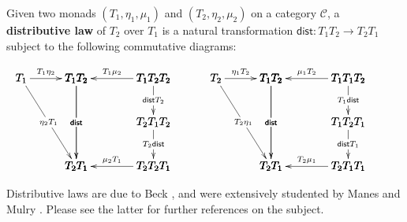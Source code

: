 \documentclass{article}
\let\mto\to
\let\to\relax
\newcommand{\to}{\rightarrow}
\newcommand{\cat}[1]{\mathcal{#1}}
\begin{document}
Given two monads $(T_1,\eta_1,\mu_1)$ and $(T_2,\eta_2,\mu_2)$ on a
category $\cat{C}$, a \textbf{distributive law} of $T_2$ over $T_1$ is
a natural transformation $\mathsf{dist} : T_1T_2 \mto T_2T_1$
subject to the following commutative diagrams:
\begin{center}  
  \begin{math}
    \begin{array}{lll}
      \bfig
      \qtriangle|amm|<500,800>[
        T_1`
        T_1T_2`
        T_2T_1;
        T_1\eta_2`
        \eta_2T_1`
        \mathsf{dist}]
      \square(500,0)|amma|/<-`->``<-/<700,800>[
        T_1T_2`
        T_1T_2T_2`
        T_2T_1`
        T_2T_2T_1;
        T_1\mu_2`
        \mathsf{dist}``
        \mu_2T_1]
      \morphism(1200,800)|m|<0,-400>[
        T_1T_2T_2`
        T_2T_1T_2;
        \mathsf{dist}T_2]
      \morphism(1200,400)|m|<0,-400>[
        T_2T_1T_2`
        T_2T_2T_1;
        T_2\mathsf{dist}]
      \efig
      & \quad &
      \bfig
      \qtriangle|amm|<500,800>[
        T_2`
        T_1T_2`
        T_2T_1;
        \eta_1T_2`
        T_2\eta_1`
        \mathsf{dist}]
      \square(500,0)|amma|/<-`->``<-/<700,800>[
        T_1T_2`
        T_1T_1T_2`
        T_2T_1`
        T_2T_1T_1;
        \mu_1T_2`
        \mathsf{dist}``
        T_2\mu_1]
      \morphism(1200,800)|m|<0,-400>[
        T_1T_1T_2`
        T_1T_2T_1;
        T_1\mathsf{dist}]
      \morphism(1200,400)|m|<0,-400>[
        T_1T_2T_1`
        T_2T_1T_1;
        \mathsf{dist}T_1]
      \efig
    \end{array}
  \end{math}
\end{center}
Distributive laws are due to Beck \cite{Beck:1969}, and were
extensively studented by Manes and Mulry \cite{Manes:2007,Manes:2008}.
Please see the latter for further references on the subject.
\end{document}
